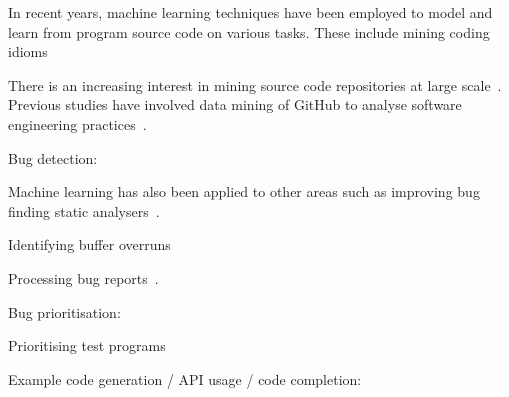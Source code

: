 In recent years, machine learning techniques have been employed to model and learn from program source code on various tasks. These include mining coding  idioms~\cite{Allamanis2014}

There is an increasing interest in mining source code repositories at large scale~\cite{Allamanis2013a,White2015a,Bird2009}. Previous studies have involved data mining of GitHub to analyse software engineering practices~\cite{Wu2014,Guzman2014,Baishakhi2014a,Vasilescu2015}.



Bug detection:

Machine learning has also been applied to other areas such as improving bug finding static analysers~\cite{Heo2017,Koc2017}.

Identifying buffer overruns~\cite{Choi2016}

Processing bug reports~\cite{Lam2016,Huo2016}.






Bug prioritisation:

Prioritising test programs~\cite{Chen2017}

Example code generation / API usage / code completion:

